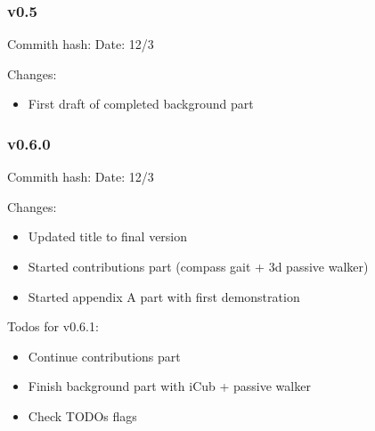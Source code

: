 \subsubsection*{v0.5}
\begin{flushleft}
Commith hash: 
Date: 12/3

Changes:
\begin{itemize}
    \item First draft of completed background part
\end{itemize}
\end{flushleft}

\subsubsection*{v0.6.0}
\begin{flushleft}
Commith hash: 
Date: 12/3

Changes:
\begin{itemize}
    \item Updated title to final version
    \item Started contributions part (compass gait + 3d passive walker)
    \item Started appendix A part with first demonstration
\end{itemize}
\end{flushleft}

Todos for v0.6.1:
\begin{itemize}
    \item Continue contributions part
    \item Finish background part with iCub + passive walker
    \item Check TODOs flags
\end{itemize}